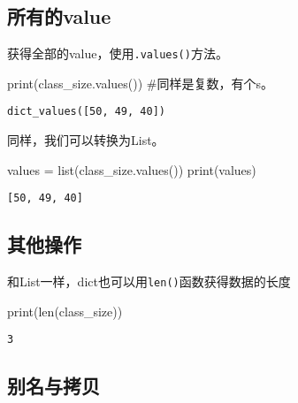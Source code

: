 \documentclass[
  letterpaper,
  DIV=11,
  numbers=noendperiod]{scrreprt}
\newenvironment{Shaded}{\begin{snugshade}}{\end{snugshade}}
\newcommand{\BuiltInTok}[1]{\textcolor[rgb]{0.00,0.23,0.31}{#1}}
\newcommand{\CommentTok}[1]{\textcolor[rgb]{0.37,0.37,0.37}{#1}}
\newcommand{\NormalTok}[1]{\textcolor[rgb]{0.00,0.23,0.31}{#1}}
\newcommand{\OperatorTok}[1]{\textcolor[rgb]{0.37,0.37,0.37}{#1}}
\begin{document}
\hypertarget{ux6240ux6709ux7684value}{%
\subsection{所有的value}\label{ux6240ux6709ux7684value}}

获得全部的value，使用\texttt{.values()}方法。

\begin{Shaded}
\begin{Highlighting}[]
\BuiltInTok{print}\NormalTok{(class\_size.values()) }\CommentTok{\#同样是复数，有个s。}
\end{Highlighting}
\end{Shaded}

\begin{verbatim}
dict_values([50, 49, 40])
\end{verbatim}

同样，我们可以转换为List。

\begin{Shaded}
\begin{Highlighting}[]
\NormalTok{values }\OperatorTok{=} \BuiltInTok{list}\NormalTok{(class\_size.values())}
\BuiltInTok{print}\NormalTok{(values)}
\end{Highlighting}
\end{Shaded}

\begin{verbatim}
[50, 49, 40]
\end{verbatim}

\hypertarget{ux5176ux4ed6ux64cdux4f5c}{%
\subsection{其他操作}\label{ux5176ux4ed6ux64cdux4f5c}}

和List一样，dict也可以用\texttt{len()}函数获得数据的长度

\begin{Shaded}
\begin{Highlighting}[]
\BuiltInTok{print}\NormalTok{(}\BuiltInTok{len}\NormalTok{(class\_size))}
\end{Highlighting}
\end{Shaded}

\begin{verbatim}
3
\end{verbatim}

\hypertarget{ux522bux540dux4e0eux62f7ux8d1d}{%
\subsection{别名与拷贝}\label{ux522bux540dux4e0eux62f7ux8d1d}}
\end{document}
